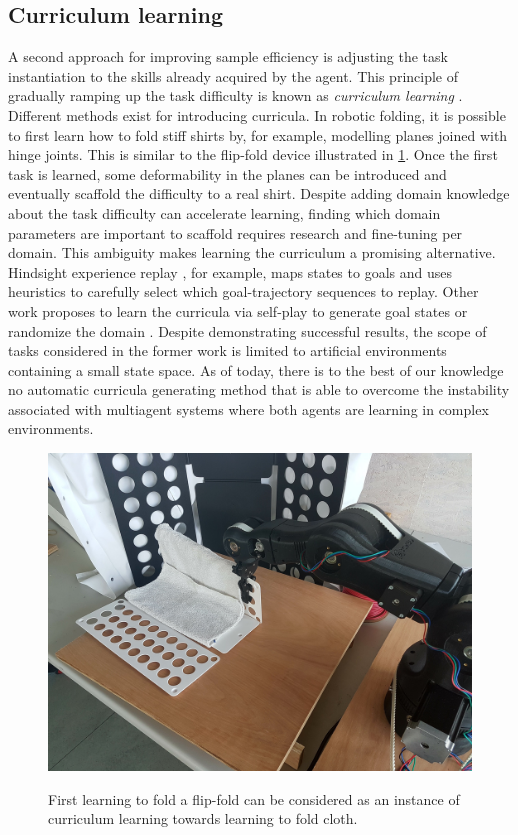 \documentclass[\home/main.tex]{subfiles}
\begin{document}
\subsection{Curriculum learning}
A second approach for improving sample efficiency is adjusting the task instantiation to the skills already acquired by the agent. This principle of gradually ramping up the task difficulty is known as \emph{curriculum learning} \autocite{Selfridge1985}. Different methods exist for introducing curricula. In robotic folding, it is possible to first learn how to fold stiff shirts by, for example, modelling planes joined with hinge joints. This is similar to the flip-fold device illustrated in \cref{fig:towards_flipfold}. Once the first task is learned, some deformability in the planes can be introduced and eventually scaffold the difficulty to a real shirt. Despite adding domain knowledge about the task difficulty can accelerate learning, finding which domain parameters are important to scaffold requires research and fine-tuning per domain. This ambiguity makes learning the curriculum a promising alternative.  
Hindsight experience replay \autocite{andrychowicz2017hindsight}, for example, maps states to goals and uses heuristics to carefully select which goal-trajectory sequences to replay. Other work proposes to learn the curricula via self-play to generate goal states \autocite{sukhbaatar2017intrinsic} or randomize the domain \autocite{raparthy2020generating}. Despite demonstrating successful results, the scope of tasks considered in the former work is limited to artificial environments containing a small state space. As of today, there is to the best of our knowledge no automatic curricula generating method that is able to overcome the instability associated with multiagent systems where both agents are learning in complex environments.

\begin{figure}[!tbp]
      \includegraphics[width=\textwidth]{figures/flipfold_moveo.jpg}
      \label{fig:towards_flipfold}
    \caption{First learning to fold a flip-fold can be considered as an instance of curriculum learning towards learning to fold cloth.}
  \end{figure}
  
\end{document}
